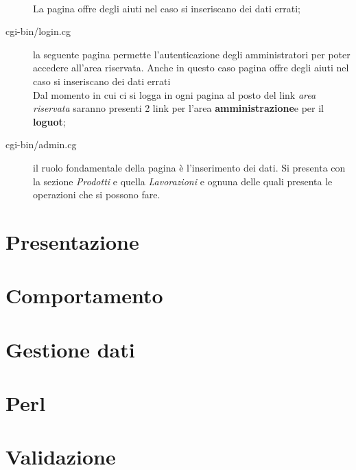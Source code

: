 \documentclass[11pt]{article}
\begin{document}
\begin{description}
	 \\La pagina offre degli aiuti nel caso si inseriscano dei dati errati;
	 \item[cgi-bin/login.cg] la seguente pagina permette l'autenticazione degli amministratori per poter accedere all'area riservata. Anche in questo caso pagina offre degli aiuti nel caso si inseriscano dei dati errati
	 \\Dal momento in cui ci si logga in ogni pagina al posto del link \textit{area riservata} saranno presenti 2 link per l'area \textbf{amministrazione}e per il \textbf{loguot};
	 \item[cgi-bin/admin.cg] il ruolo fondamentale della pagina è l'inserimento dei dati. Si presenta con la sezione \textit{Prodotti} e quella \textit{Lavorazioni} e ognuna delle quali presenta le operazioni che si possono fare.
	 
\end{description}
\newpage

\section{Presentazione}
\newpage
\section{Comportamento}
\newpage
\section{Gestione dati}
\newpage
\section{Perl}
\newpage
\section{Validazione}
\end{document}

